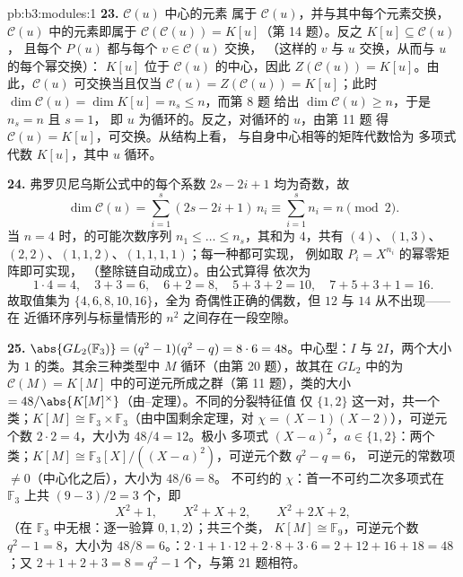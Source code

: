 \begin{solution}{pb:b3:modules:1}
\textbf{23.} $\mathcal C(u)$ 中心的元素
属于 $\mathcal C(u)$，并与其中每个元素交换，
$\mathcal C(u)$ 中的元素即属于 $\mathcal C(\mathcal C(u)) =
K[u]$（第 14 题）。反之 $K[u] \subseteq \mathcal C(u)$，
且每个 $P(u)$ 都与每个 $v \in \mathcal C(u)$ 交换，
（这样的 $v$ 与 $u$ 交换，从而与 $u$ 的每个幂交换）：
$K[u]$ 位于 $\mathcal C(u)$ 的中心，因此 $Z(\mathcal C(u))
= K[u]$。由此，$\mathcal C(u)$ 可交换当且仅当
$\mathcal C(u) = Z(\mathcal C(u)) = K[u]$；此时
$\dim\mathcal C(u) = \dim K[u] = n_s \leq n$，而第 8 题
给出 $\dim\mathcal C(u) \geq n$，于是 $n_s = n$ 且 $s = 1$，
即 $u$ 为循环的。反之，对循环的 $u$，由第 11 题
得 $\mathcal C(u) = K[u]$，可交换。从结构上看，
与自身中心相等的矩阵代数恰为
多项式代数 $K[u]$，其中 $u$ 循环。

\textbf{24.} 弗罗贝尼乌斯公式中的每个系数 $2s - 2i + 1$
均为奇数，故
\[
\dim\mathcal C(u) = \sum_{i=1}^s(2s - 2i + 1)\,n_i
\equiv \sum_{i=1}^s n_i = n \pmod 2 .
\]
当 $n = 4$ 时，的可能次数序列 $n_1 \leq \dots
\leq n_s$，其和为 $4$，共有
$(4)$、$(1, 3)$、$(2, 2)$、$(1, 1, 2)$、$(1, 1, 1, 1)$；每一种都可实现，
例如取 $P_i = X^{n_i}$ 的幂零矩阵即可实现，
（整除链自动成立）。由公式算得
依次为
\[
1\cdot4 = 4, \quad 3 + 3 = 6, \quad 6 + 2 = 8, \quad
5 + 3 + 2 = 10, \quad 7 + 5 + 3 + 1 = 16 .
\]
故取值集为 $\{4, 6, 8, 10, 16\}$，全为
奇偶性正确的偶数，但 $12$ 与 $14$ 从不出现——在
近循环序列与标量情形的 $n^2$ 之间存在一段空隙。

\textbf{25.} $\abs{GL_2(\mathbb F_3)} = (q^2 - 1)(q^2 - q) =
8 \cdot 6 = 48$。中心型：$I$ 与 $2I$，两个大小为
$1$ 的类。其余三种类型中 $M$ 循环（由第
20 题），故其在 $GL_2$ 中的为
$\mathcal C(M) = K[M]$ 中的可逆元所成之群（第 11 题），类的大小
$=48/\abs{K[M]^\times}$（由–定理）。不同的分裂特征值
仅 $\{1, 2\}$ 这一对，共一个类；$K[M]
\cong \mathbb F_3 \times \mathbb F_3$（由中国剩余定理，对 $\chi = (X-1)
(X-2)$），可逆元个数 $2 \cdot 2 = 4$，大小为 $48/4 = 12$。极小
多项式 $(X - a)^2$，$a \in \{1, 2\}$：两个类；$K[M] \cong
\mathbb F_3[X]/((X-a)^2)$，可逆元个数 $q^2 - q = 6$，
可逆元的常数项 $\neq 0$（中心化之后），大小为 $48/6 = 8$。
不可约的 $\chi$：首一不可约二次多项式在
$\mathbb F_3$ 上共 $(9 - 3)/2 = 3$ 个，即
\[
X^2 + 1, \qquad X^2 + X + 2, \qquad X^2 + 2X + 2,
\]
（在 $\mathbb F_3$ 中无根：逐一验算 $0, 1, 2$）；共三个类，
$K[M] \cong \mathbb F_9$，可逆元个数 $q^2 - 1 = 8$，大小为 $48/8 =
6$。：$2\cdot1 + 1\cdot12 + 2\cdot8 + 3\cdot6 =
2 + 12 + 16 + 18 = 48$；又 $2 + 1 + 2 + 3 = 8 = q^2 - 1$
个，与第 21 题相符。
\end{solution}
